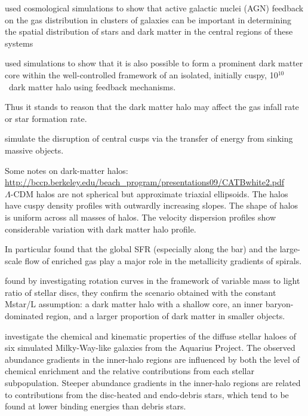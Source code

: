 \documentclass[11pt, a4paper, onecolumn]{article}
\begin{document}
\begin{multicols}{2}
    \citet{martizzi13} used cosmological simulations to show that active
    galactic nuclei (AGN) feedback on the gas distribution in clusters of
    galaxies can be important in determining the spatial distribution of stars
    and dark matter in the central regions of these systems

    \citet{teyssier13} used simulations to show that it is also possible to
    form a prominent dark matter core within the well-controlled framework of
    an isolated, initially cuspy, 10$^{10}$ \msun\ dark matter halo using
    feedback mechanisms.

    
    Thus it
    stands to reason that the dark matter halo may affect the gas infall rate
    or star formation rate.



    \citet{goerdt10} simulate the disruption of central cusps via the transfer
    of energy from sinking massive objects.

    Some notes on dark-matter halos:\\
    \url{http://bccp.berkeley.edu/beach_program/presentations09/CATBwhite2.pdf}\\
    $\Lambda$-CDM halos are not spherical but approximate triaxial ellipsoids.
    The halos have cuspy density profiles with outwardly increasing slopes.
    The shape of halos is uniform across all masses of halos.  The velocity
    dispersion profiles show considerable variation with dark matter halo
    profile.


    In particular 
    \citet{martel13} found that the global SFR (especially along the bar) and
    the large-scale flow of enriched gas play a major role in the metallicity
    gradients of spirals.

    \citet{portinari10} found by investigating rotation curves in the framework
    of variable mass to light ratio of stellar discs, they confirm the scenario
    obtained with the constant Mstar/L assumption: a dark matter halo with a
    shallow core, an inner baryon-dominated region, and a larger proportion of
    dark matter in smaller objects.



    \citet{tissera13} investigate the chemical and kinematic properties of the
    diffuse stellar haloes of six simulated Milky-Way-like galaxies from the
    Aquarius Project. The observed abundance gradients in the inner-halo
    regions are influenced by both the level of chemical enrichment and the
    relative contributions from each stellar subpopulation. Steeper abundance
    gradients in the inner-halo regions are related to contributions from the
    disc-heated and endo-debris stars, which tend to be found at lower binding
    energies than debris stars. 


\end{multicols}
\end{document}
